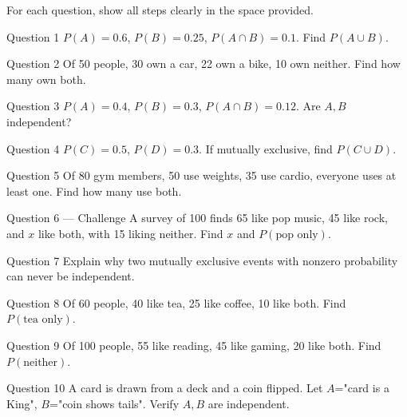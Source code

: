 \documentclass[11pt]{article}
\begin{document}
\clearpage
{}
For each question, show all steps clearly in the space provided.

\begin{qbox}{Question 1}
$P(A)=0.6$, $P(B)=0.25$, $P(A\cap B)=0.1$. Find $P(A\cup B)$.\workspace{2.4cm}
\end{qbox}

\begin{qbox}{Question 2}
Of 50 people, 30 own a car, 22 own a bike, 10 own neither. Find how many own both.\workspace{2.4cm}
\end{qbox}

\begin{qbox}{Question 3}
$P(A)=0.4$, $P(B)=0.3$, $P(A\cap B)=0.12$. Are $A,B$ independent?\workspace{2.4cm}
\end{qbox}

\begin{qbox}{Question 4}
$P(C)=0.5$, $P(D)=0.3$. If mutually exclusive, find $P(C\cup D)$.\workspace{2.4cm}
\end{qbox}

\begin{qbox}{Question 5}
Of 80 gym members, 50 use weights, 35 use cardio, everyone uses at least one. Find how many use both.\workspace{2.4cm}
\end{qbox}

\begin{qbox}{Question 6 --- Challenge}
A survey of 100 finds 65 like pop music, 45 like rock, and $x$ like both, with 15 liking neither. Find $x$ and $P(\text{pop only})$.\workspace{3.4cm}
\end{qbox}

\begin{qbox}{Question 7}
Explain why two mutually exclusive events with nonzero probability can never be independent.\workspace{2.4cm}
\end{qbox}

\begin{qbox}{Question 8}
Of 60 people, 40 like tea, 25 like coffee, 10 like both. Find $P(\text{tea only})$.\workspace{2.4cm}
\end{qbox}

\begin{qbox}{Question 9}
Of 100 people, 55 like reading, 45 like gaming, 20 like both. Find $P(\text{neither})$.\workspace{2.4cm}
\end{qbox}

\begin{qbox}{Question 10}
A card is drawn from a deck and a coin flipped. Let $A$="card is a King", $B$="coin shows tails". Verify $A,B$ are independent.\workspace{2.4cm}
\end{qbox}
\end{document}
